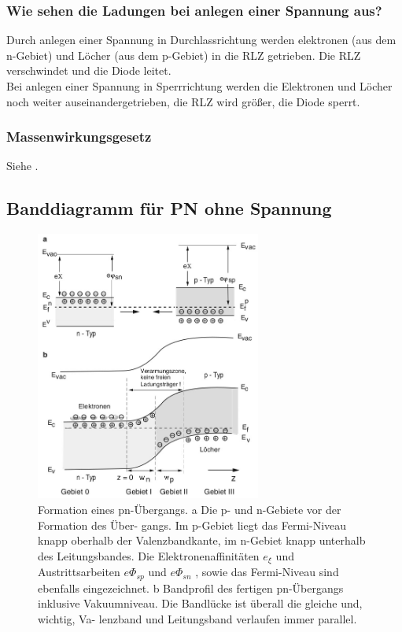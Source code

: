     \subsubsection{Wie sehen die Ladungen bei anlegen einer Spannung aus?}
    Durch anlegen einer Spannung in Durchlassrichtung werden elektronen (aus dem n-Gebiet) und L\"ocher (aus dem p-Gebiet) in die RLZ getrieben. Die RLZ verschwindet und die Diode leitet.\\
    Bei anlegen einer Spannung in Sperrrichtung werden die Elektronen und L\"ocher noch weiter auseinandergetrieben, die RLZ wird gr\"o{\ss}er, die Diode sperrt.
    \subsubsection{Massenwirkungsgesetz}
    Siehe .

\subsection{Banddiagramm für PN ohne Spannung }\label{k5:pnBand}
\begin{figure}
    \centering
    \includegraphics[width=0.66\textwidth]{fig/pn-bandstruktur.jpg}
    \caption{Formation eines pn-Übergangs. a Die p- und n-Gebiete vor der Formation des Über-
gangs. Im p-Gebiet liegt das Fermi-Niveau knapp oberhalb der Valenzbandkante, im n-Gebiet
knapp unterhalb des Leitungsbandes. Die Elektronenaffinitäten $e_\xi$ und Austrittsarbeiten $e\Phi_{sp}$
und $e\Phi_{sn}$ , sowie das Fermi-Niveau sind ebenfalls eingezeichnet. b Bandprofil des fertigen
pn-Übergangs inklusive Vakuumniveau. Die Bandlücke ist überall die gleiche und, wichtig, Va-
lenzband und Leitungsband verlaufen immer parallel.}
    \label{fig:pn-banddiagramm}
\end{figure}


